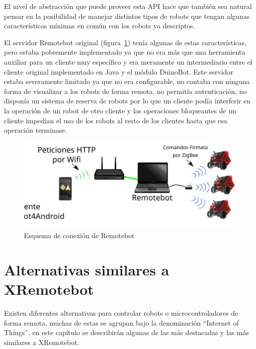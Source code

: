 El nivel de abstracción que puede proveer esta API hace que también sea
natural pensar en la posibilidad de manejar distintos tipos de robots
que tengan algunas características mínimas en común con los robots ya
descriptos.

El servidor Remotebot original (figura~\ref{fig:arquitectura_remotebot})
tenía algunas de estas características, pero
estaba pobremente implementado ya que no era más que una herramienta auxiliar
para un cliente muy específico y era meramente un intermediario entre el
cliente original implementado en Java y el módulo DuinoBot. Este servidor
estaba severamente limitado
ya que no era configurable, no contaba con ninguna forma de visualizar a los
robots de forma remota, no permitía autenticación, no disponía un sistema
de reserva de robots por lo que un cliente podía interferir en la operación
de un robot de otro cliente y las operaciones bloqueantes de un cliente
impedían el uso de los robots al resto de los clientes hasta que esa operación
terminase.


\begin{figure}
    \centering
    \includegraphics[width=\textwidth]{figures/arquitectura_remotebot}
    \caption{Esquema de conexión de Remotebot}
    \label{fig:arquitectura_remotebot}
\end{figure}


\section{Alternativas similares a XRemotebot}

Existen diferentes alternativas para controlar robots o microcontroladores
de forma remota, muchas de estas se agrupan bajo la denominación
``Internet of Things'', en este capítulo se describirán algunas de las
más destacadas y las más similares a XRemotebot.

